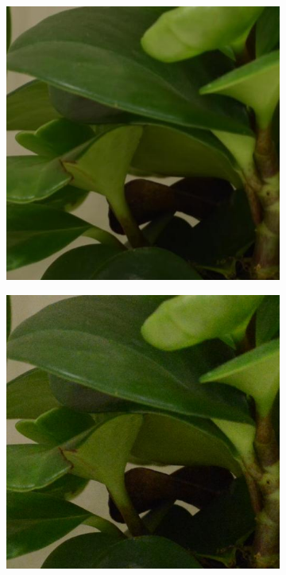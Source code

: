 \begin{figure}
\begin{subfigure}[t]{0.24\textwidth}
    \end{subfigure}
    \hfill
    \begin{subfigure}[t]{0.24\textwidth}
        \centering
        \includegraphics[width=1\textwidth]{images/dataset/NikonD800_6-3_125_5000_plant_1_mean.JPG}
    \end{subfigure}
    \hfill
    \begin{subfigure}[t]{0.24\textwidth}
        \centering
        \includegraphics[width=1\textwidth]{images/dataset/NikonD800_6-3_125_5000_plant_1_real.JPG}
    \end{subfigure}



\end{figure}
